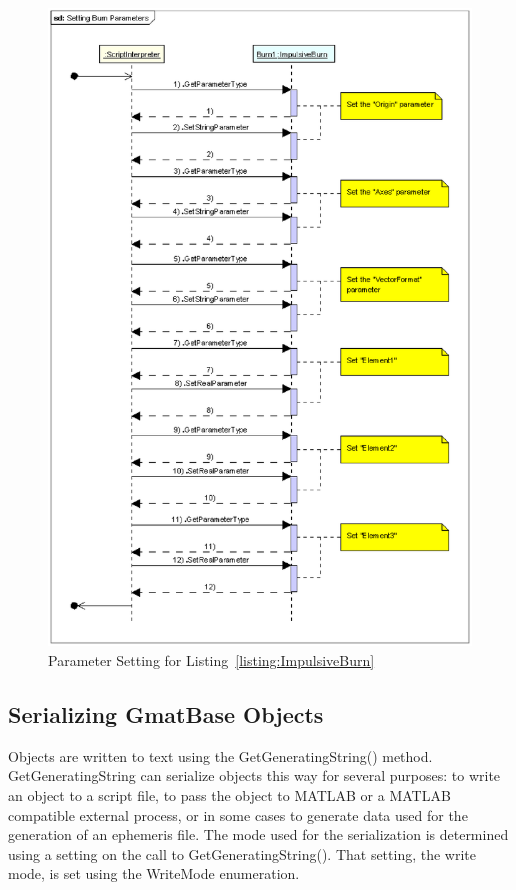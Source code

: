 \begin{figure}[htb]
\begin{center}
\includegraphics[scale=0.5]{Images/SettingBurnParameters.eps}
\caption{\label{figure:SettingBurnParameters}Parameter Setting for
Listing~\ref{listing:ImpulsiveBurn}}
\end{center}
\end{figure}

\subsection{Serializing GmatBase Objects}

Objects are written to text using the GetGeneratingString() method.  GetGeneratingString can
serialize objects this way for several purposes: to write an object to a script file, to pass the
object to MATLAB or a MATLAB compatible external process, or in some cases to generate data used
for the generation of an ephemeris file.  The mode used for the serialization is determined using a
setting on the call to GetGeneratingString().  That setting, the write mode, is set using the
WriteMode enumeration.

